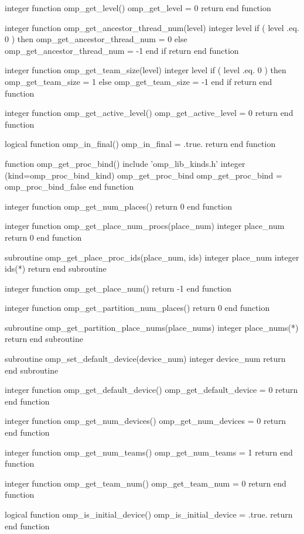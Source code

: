{\begin{codepar}
integer function omp\_get\_level()
  omp\_get\_level = 0
  return
end function

integer function omp\_get\_ancestor\_thread\_num(level)
  integer level
  if ( level .eq. 0 ) then
     omp\_get\_ancestor\_thread\_num = 0
  else
     omp\_get\_ancestor\_thread\_num = -1
  end if
  return
end function

integer function omp\_get\_team\_size(level)
  integer level
  if ( level .eq. 0 ) then
     omp\_get\_team\_size = 1
  else
     omp\_get\_team\_size = -1
  end if
  return
end function

integer function omp\_get\_active\_level()
  omp\_get\_active\_level = 0
  return
end function

logical function omp\_in\_final()
  omp\_in\_final = .true.
  return
end function

function omp\_get\_proc\_bind()
  include 'omp\_lib\_kinds.h'
  integer (kind=omp\_proc\_bind\_kind) omp\_get\_proc\_bind
  omp\_get\_proc\_bind = omp\_proc\_bind\_false
end function 

integer function omp\_get\_num\_places()
  return 0
end function

integer function omp\_get\_place\_num\_procs(place\_num)
  integer place\_num
  return 0
end function

subroutine omp\_get\_place\_proc\_ids(place\_num, ids)
  integer place\_num
  integer ids(*)
  return
end subroutine

integer function omp\_get\_place\_num()
  return -1
end function

integer function omp\_get\_partition\_num\_places()
  return 0
end function

subroutine omp\_get\_partition\_place\_nums(place\_nums)
  integer place\_nums(*)
  return
end subroutine

subroutine omp\_set\_default\_device(device\_num)
  integer device\_num
  return
end subroutine

integer function omp\_get\_default\_device()
  omp\_get\_default\_device = 0
  return
end function

integer function omp\_get\_num\_devices()
  omp\_get\_num\_devices = 0
  return
end function

integer function omp\_get\_num\_teams()
  omp\_get\_num\_teams = 1
  return
end function

integer function omp\_get\_team\_num()
  omp\_get\_team\_num = 0
  return
end function

logical function omp\_is\_initial\_device()
  omp\_is\_initial\_device = .true.
  return
end function


\end{codepar}}
